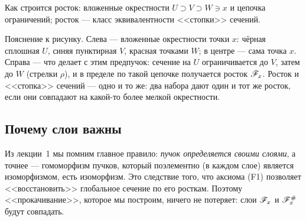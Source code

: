 \begin{risunok}{Как строится росток: вложенные окрестности
 $U\supset V\supset W\ni x$ и цепочка ограничений;
 росток --- класс эквивалентности <<стопки>> сечений.}
\end{risunok}

Пояснение к рисунку. Слева --- вложенные окрестности точки $x$:
чёрная сплошная $U$, синяя пунктирная $V$, красная точками $W$;
в центре --- сама точка $x$. Справа --- что делает с этим
предпучок: сечение на $U$ ограничивается до $V$, затем до $W$
(стрелки $\rho$), и в пределе по такой цепочке получается росток
$\mathscr{F}_x$. Росток и <<стопка>> сечений --- одно и то же:
два набора дают один и тот же росток, если они совпадают на
какой-то более мелкой окрестности.

\subsection{Почему слои важны}
Из лекции~1 мы помним главное правило: \emph{пучок определяется своими
слоями}, а точнее --- гомоморфизм пучков, который поэлементно (в каждом
слое) является изоморфизмом, есть изоморфизм. Это следствие того, что
аксиома (F1) позволяет <<восстановить>> глобальное сечение по его
росткам. Поэтому <<прокачивание>>, которое мы построим, ничего не
потеряет: слои $\mathscr{F}_x$ и $\mathscr{F}^{\#}_x$ будут совпадать.

\begin{bookbox}
\end{bookbox}

